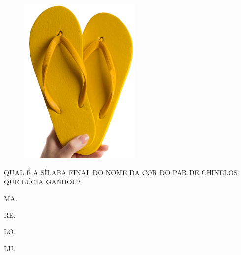 \begin{minipage}{.3\textwidth}
\begin{figure}[H]
\includegraphics[width=\textwidth]{media/image189.jpg}
\end{figure}
\end{minipage}
\hspace{1cm}
\begin{minipage}{.7\textwidth}
QUAL É A SÍLABA FINAL DO NOME DA COR DO PAR DE CHINELOS QUE LÚCIA GANHOU?

\begin{escolha}
\item MA.

\item RE.

\item LO.

\item LU.
\end{escolha}
\end{minipage}

